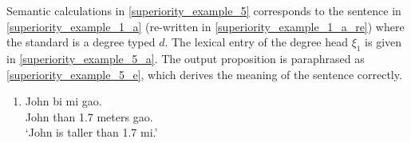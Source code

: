 \documentclass{ctexart}
\begin{document}
Semantic calculations in \ref{superiority_example_5} corresponds to the sentence in \ref{superiority_example_1_a} (re-written in \ref{superiority_example_1_a_re}) where the standard is a degree typed $d$. The lexical entry of the degree head $\xi_1$ is given in \ref{superiority_example_5_a}. The output proposition is paraphrased as \ref{superiority_example_5_e}, which derives the meaning of the sentence correctly.

\begin{enumerate}
    \item \label{superiority_example_1_a_re}
    John \enspace bi \enspace {} mi \enspace \enspace \enspace gao. \\
    John than 1.7 meters gao. \\
    `John is taller than 1.7 mi.' 
\end{enumerate}
\end{document}
